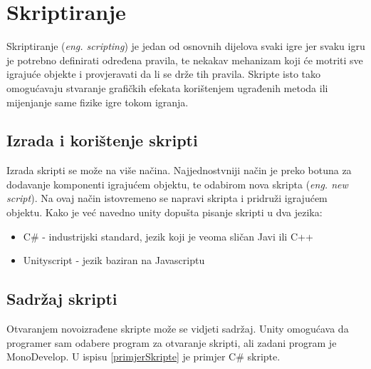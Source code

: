\section{Skriptiranje}
Skriptiranje (\emph{eng. scripting}) je jedan od osnovnih dijelova svaki igre jer svaku igru je potrebno definirati određena pravila, te nekakav mehanizam koji će motriti sve igrajuće objekte i provjeravati da li se drže tih pravila. Skripte isto tako omogućavaju stvaranje grafičkih efekata korištenjem ugrađenih metoda ili mijenjanje same fizike igre tokom igranja.
\subsection{Izrada i korištenje skripti}
Izrada skripti se može na više načina. Najjednostvniji način je preko botuna za dodavanje komponenti igrajućem objektu, te odabirom nova skripta (\emph{eng. new script}). Na ovaj način istovremeno se napravi skripta i pridruži igrajućem objektu. Kako je već navedno unity dopušta pisanje skripti u dva jezika:
\begin{itemize} 
	\item C\# - industrijski standard, jezik koji je veoma sličan Javi ili C++
	\item Unityscript - jezik baziran na Javascriptu
\end{itemize}
\subsection{Sadržaj skripti}
Otvaranjem novoizrađene skripte može se vidjeti sadržaj. Unity omogućava da programer sam odabere program za otvaranje skripti, ali zadani program je MonoDevelop. U ispisu \ref{primjerSkripte}  je primjer C\# skripte.

